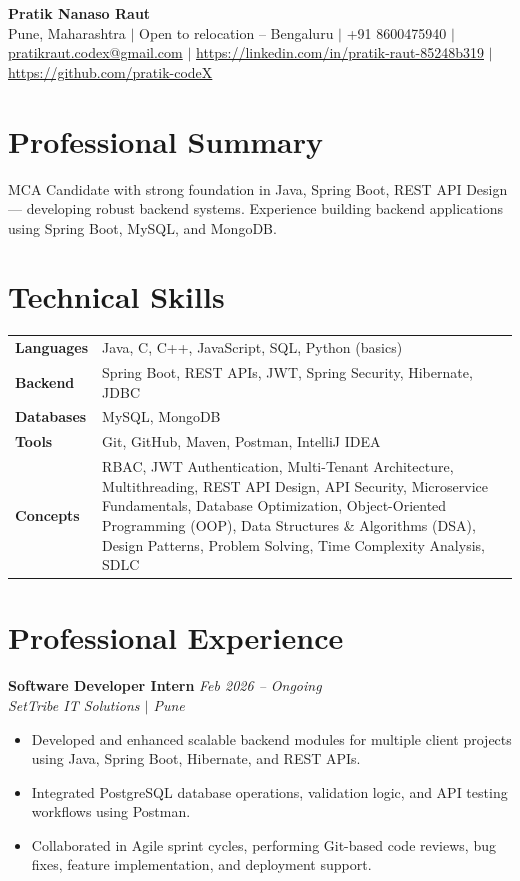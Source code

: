 \documentclass[10.5pt,a4paper]{article}
\begin{document}
\begin{center}
{\Large\bfseries Pratik Nanaso Raut}\\[2pt]
Pune, Maharashtra $|$ Open to relocation -- Bengaluru $|$ +91 8600475940 $|$ \href{mailto:pratikraut.codex@gmail.com}{pratikraut.codex@gmail.com} $|$ \href{https://linkedin.com/in/pratik-raut-85248b319}{https://linkedin.com/in/pratik-raut-85248b319} $|$ \href{https://github.com/pratik-codeX}{https://github.com/pratik-codeX}
\end{center}
\vspace{-2pt}
\section{Professional Summary}
MCA Candidate with strong foundation in Java, Spring Boot, REST API Design — developing robust backend systems. Experience building backend applications using Spring Boot, MySQL, and MongoDB.
\section{Technical Skills}
\begin{tabular}{@{}p{}p{}@{}}
\textbf{Languages} & Java, C, C++, JavaScript, SQL, Python (basics) \\[1pt]
\textbf{Backend} & Spring Boot, REST APIs, JWT, Spring Security, Hibernate, JDBC \\[1pt]
\textbf{Databases} & MySQL, MongoDB \\[1pt]
\textbf{Tools} & Git, GitHub, Maven, Postman, IntelliJ IDEA \\[1pt]
\textbf{Concepts} & RBAC, JWT Authentication, Multi-Tenant Architecture, Multithreading, REST API Design, API Security, Microservice Fundamentals, Database Optimization, Object-Oriented Programming (OOP), Data Structures \& Algorithms (DSA), Design Patterns, Problem Solving, Time Complexity Analysis, SDLC \\
\end{tabular}
\section{Professional Experience}
\textbf{Software Developer Intern} \hfill \textit{Feb 2026 -- Ongoing}
\\\textit{SetTribe IT Solutions $|$ Pune}
\begin{itemize}
  \item Developed and enhanced scalable backend modules for multiple client projects using Java, Spring Boot, Hibernate, and REST APIs.
  \item Integrated PostgreSQL database operations, validation logic, and API testing workflows using Postman.
  \item Collaborated in Agile sprint cycles, performing Git-based code reviews, bug fixes, feature implementation, and deployment support.
\end{itemize}
\end{document}
